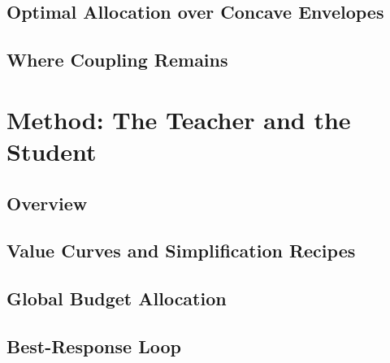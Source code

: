 \documentclass[conference]{IEEEtran}
\begin{document}
\subsection{Optimal Allocation over Concave Envelopes}
\label{sec:allocation-theory}

\subsection{Where Coupling Remains}
\label{sec:coupling}

\section{Method: The Teacher and the Student}
\label{sec:method}

\subsection{Overview}
\label{sec:method-overview}

\subsection{Value Curves and Simplification Recipes}
\label{sec:value-curves}

\subsection{Global Budget Allocation}
\label{sec:allocation}

\subsection{Best-Response Loop}
\label{sec:loop}
\end{document}
